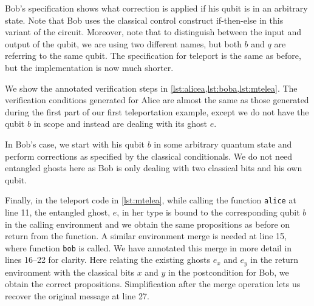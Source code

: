 Bob's specification shows what correction is applied if his qubit is in an arbitrary state. Note that Bob uses the classical control construct if-then-else in this variant of the circuit. Moreover, note that to distinguish between the input and output of the qubit, we are using two different names, but both $b$ and $q$ are referring to the same qubit. The specification for teleport is the same as before, but the implementation is now much shorter.







We show the annotated verification steps in \cref{lst:alicea,lst:boba,lst:mtelea}. The verification conditions generated for Alice are almost the same as those generated during the first part of our first teleportation example, except we do not have the qubit $b$ in scope and instead are dealing with its ghost $e$.

In Bob's case, we start with his qubit $b$ in some arbitrary quantum state and perform corrections as specified by the classical conditionals. We do not need entangled ghosts here as Bob is only dealing with two classical bits and his own qubit.

Finally, in the teleport code in \cref{lst:mtelea}, while calling the function \texttt{alice} at line 11, the entangled ghost, $e$, in her type is bound to the corresponding qubit $b$ in the calling environment and we obtain the same propositions as before on return from the function. A similar environment merge is needed at line 15, where function \texttt{bob} is called. We have annotated this merge in more detail in lines 16--22 for clarity. Here relating the existing ghosts $e_x$ and $e_y$ in the return environment with the classical bits $x$ and $y$ in the postcondition for Bob, we obtain the correct propositions. Simplification after the merge operation lets us recover the original message at line 27.

